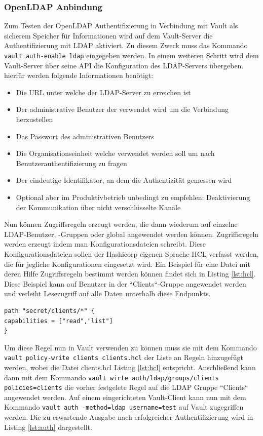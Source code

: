 \documentclass[
book,
a4paper,   
titlepage,  
halfparskip,
12pt        
]{scrartcl}
\newcommand\inline{\lstinline[basicstyle=\ttfamily]}
\begin{document}
\begin{onehalfspacing}
\subsubsection{OpenLDAP Anbindung}
Zum Testen der OpenLDAP Authentifizierung in Verbindung mit Vault als sicherem Speicher für Informationen wird auf dem Vault-Server die Authentifizierung mit \ac{LDAP} aktiviert. Zu diesem Zweck muss das Kommando \inline|vault auth-enable ldap| eingegeben werden. In einem weiteren Schritt wird dem Vault-Server über seine \ac{API} die Konfiguration des LDAP-Servers übergeben. hierfür werden folgende Informationen benötigt\cite{vaultapi}:
\begin{itemize}
	\item Die \ac{URL} unter welche der LDAP-Server zu erreichen ist
	\item Der administrative Benutzer der verwendet wird um die Verbindung herzustellen
	\item Das Passwort des administrativen Benutzers
	\item Die Organisationseinheit welche verwendet werden soll um nach Benutzerauthentifizierung zu fragen
	\item Der eindeutige Identifikator, an dem die Authentizität gemessen wird
	\item Optional aber im Produktivbetrieb unbedingt zu empfehlen: Deaktivierung der Kommunikation über nicht verschlüsselte Kanäle 
\end{itemize} 
Nun können Zugriffsregeln erzeugt werden, die dann wiederum auf einzelne \ac{LDAP}-Benutzer, -Gruppen oder global angewendet werden können. Zugriffsregeln werden erzeugt indem man Konfigurationsdateien schreibt. Diese Konfigurationsdateien sollen der Hashicorp eigenen Sprache \ac{HCL} verfasst werden, die für jegliche Konfigurationen eingesetzt wird. Ein Beispiel für eine Datei mit deren Hilfe Zugriffsregeln bestimmt werden können findet sich in Listing \vref{lst:hcl}. Diese Beispiel kann auf Benutzer in der ``Clients``-Gruppe angewendet werden und verleiht Lesezugriff auf alle Daten unterhalb diese Endpunkts.\cite{vaultldap}

\begin{lstlisting}[caption={[Beispiel \acs{HCL}] Beispiel für eine Konfigurationsdatei im \ac{HCL}-Format\cite{vaultpol}}, label=lst:hcl, captionpos=b, basicstyle=\ttfamily] 
path "secret/clients/*" {
capabilities = ["read","list"]
}
\end{lstlisting}

Um diese Regel nun in Vault verwenden zu können muss sie mit dem Kommando \inline|vault policy-write clients clients.hcl| der Liste an Regeln hinzugefügt werden, wobei die Datei clients.hcl Listing \vref{lst:hcl} entspricht. Anschließend kann dann  mit dem Kommando \inline|vault wirte auth/ldap/groups/clients policies=clients| die vorher festgelete Regel auf die \ac{LDAP} Gruppe ``Clients`` angewendet werden.\newline
Auf einem eingerichteten Vault-Client kann nun mit dem Kommando \inline|vault auth -method=ldap username=test| auf Vault zugegriffen werden. Die zu erwartende Ausgabe nach erfolgreicher Authentifizierung wird in Listing \vref{lst:auth} dargestellt.\cite{vaultldap}


\end{onehalfspacing}
\end{document}
